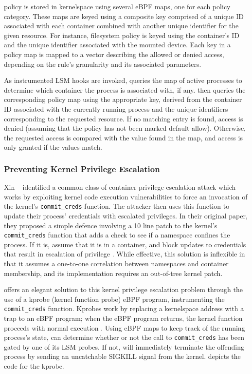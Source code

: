 
\bpfcontain{} policy is stored in kernelspace using several eBPF maps, one for each policy category. These maps are keyed using a composite key comprised of a unique ID associated with each container combined with another unique identifier for the given resource. For instance, filesystem policy is keyed using the container's ID and the unique identifier associated with the mounted device. Each key in a policy map is mapped to a vector describing the allowed or denied access, depending on the rule's granularity and its associated parameters.

As instrumented LSM hooks are invoked, \bpfcontain{} queries the map of active processes to determine which container the process is associated with, if any.  \bpfcontain{} then queries the corresponding policy map using the appropriate key, derived from the container ID associated with the currently running process and the unique identifiers corresponding to the requested resource. If no matching entry is found, access is denied (assuming that the policy has not been marked default-allow).  Otherwise, the requested access is compared with the value found in the map, and access is only granted if the values match.

\subsubsection{Preventing Kernel Privilege Escalation}

Xin \etal~\cite{xin2018_container_security} identified a common class of container privilege escalation attack which works by exploiting kernel code execution vulnerabilities to force an invocation of the kernel's \texttt{commit\_creds} function. The attacker then uses this function to update their process' credentials with escalated privileges. In their original paper, they proposed a simple defence involving a 10 line patch to the kernel's \texttt{commit\_creds} function that adds a check to see if a namespace confines the process. If it is, assume that it is in a container, and block updates to credentials that result in escalation of privilege \cite{xin2018_container_security}. While effective, this solution is inflexible in that it assumes a one-to-one correlation between namespaces and container membership, and its implementation requires an out-of-tree kernel patch.

\bpfcontain{} offers an elegant solution to this kernel privilege escalation problem through the use of a kprobe (kernel function probe) eBPF program, instrumenting the \texttt{commit\_creds} function. Kprobes work by replacing a kernelspace address with a trap to an eBPF program; when the eBPF program returns, the kernel function proceeds with normal execution \cite{gregg2019_bpf}. Using eBPF maps to keep track of the running process's state, \bpfcontain{} can determine whether or not the call to \texttt{commit\_creds} has been gated by one of its LSM probes. If not, \bpfcontain{} will immediately terminate the offending process by sending an uncatchable SIGKILL signal from the kernel.  depicts the code for the kprobe.

